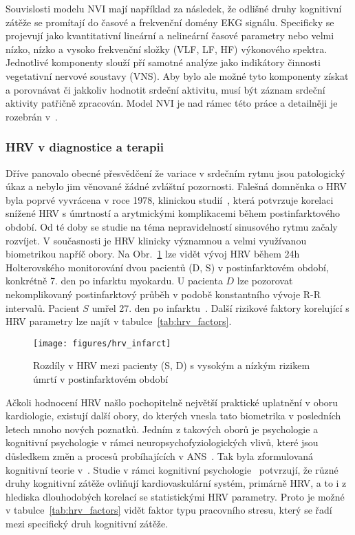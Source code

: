 Souvislosti modelu NVI mají například za následek, že odlišné druhy kognitivní
zátěže se promítají do časové a frekvenční domény EKG signálu. Specificky se
projevují jako kvantitativní lineární a nelineární časové parametry nebo velmi
nízko, nízko a vysoko frekvenční složky (VLF, LF, HF) výkonového spektra.
Jednotlivé komponenty slouží pří samotné analýze jako indikátory činnosti
vegetativní nervové soustavy (VNS). Aby bylo ale možné tyto komponenty získat a
porovnávat či jakkoliv hodnotit srdeční aktivitu, musí být záznam srdeční
aktivity patřičně zpracován. Model NVI je nad rámec této práce a detailněji je
rozebrán v~\cite{Smith2017}.

\subsubsection{HRV v diagnostice a terapii}
Dříve panovalo obecné přesvědčení že variace v srdečním rytmu jsou patologický
úkaz a nebylo jim věnované žádné zvláštní pozornosti. Falešná domněnka o HRV
byla poprvé vyvrácena v roce 1978, klinickou studií~\cite{Wolf1978}, která
potvrzuje korelaci snížené HRV s úmrtností a arytmickými komplikacemi během
postinfarktového období. Od té doby se studie na téma nepravidelností sinusového
rytmu začaly rozvíjet. V současnosti je HRV klinicky významnou a
velmi využívanou biometrikou napříč obory. Na Obr.~\ref{fig:hrv_infarct} lze
vidět vývoj HRV během 24h Holterovského monitorování dvou pacientů (D, S) v
postinfarktovém období, konkrétně 7. den po infarktu myokardu. U pacienta $D$
lze pozorovat nekomplikovaný postinfarktový průběh v podobě konstantního vývoje
R-R intervalů. Pacient $S$ umřel 27. den po infarktu~\cite{Malik1990}. Další
rizikové faktory korelující s HRV parametry lze najít v
tabulce~\ref{tab:hrv_factors}.

\begin{figure}[h]
	\begin{center}
		\texttt{[image: figures/hrv\_infarct]}
		\caption{Rozdíly v HRV mezi pacienty (S, D) s vysokým a nízkým rizikem úmrtí v
			postinfarktovém období \cite{Malik1990}}
		\label{fig:hrv_infarct}
	\end{center}
\end{figure}

Ačkoli hodnocení HRV našlo pochopitelně největší praktické uplatnění v oboru
kardiologie, existují další obory, do kterých vnesla tato biometrika v
posledních letech mnoho nových poznatků. Jedním z takových oborů je psychologie
a kognitivní psychologie v rámci neuropsychofyziologických vlivů, které jsou
důsledkem změn a procesů probíhajících v ANS~\cite{Bernardi2009}. Tak byla
zformulovaná kognitivní teorie v~\cite{Forte2019,Plass2010}. Studie v rámci
kognitivní
psychologie~\cite{Bernardi2009,Solhjoo2019,Salahuddin2007,Ishaque2020}
potvrzují, že různé druhy kognitivní zátěže ovliňují kardiovaskulární systém,
primárně HRV, a to i z hlediska dlouhodobých korelací se statistickými HRV
parametry. Proto je možné v tabulce~\ref{tab:hrv_factors} vidět faktor typu
pracovního stresu, který se řadí mezi specifický druh kognitivní zátěže.

